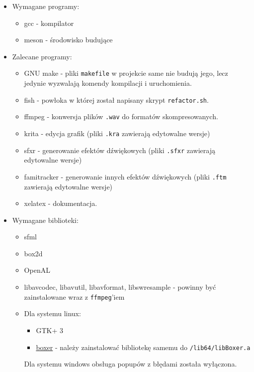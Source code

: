 \documentclass[a4paper,11pt]{article}
\begin{document}
\begin{itemize}
    \item Wymagane programy:
    \begin{itemize}
        \item gcc - kompilator
        \item meson - środowisko budujące
    \end{itemize}
    \item Zalecane programy:
    \begin{itemize}
        \item GNU make - pliki \texttt{makefile} w projekcie same nie budują jego, lecz jedynie wyzwalają komendy kompilacji i uruchomienia.
        \item fish - powłoka w której został napisany skrypt \texttt{refactor.sh}.
        \item ffmpeg - konwersja plików \texttt{.wav} do formatów skompresowanych.
        \item krita - edycja grafik (pliki \texttt{.kra} zawierają edytowalne wersje)
        \item sfxr - generowanie efektów dźwiękowych (pliki \texttt{.sfxr} zawierają edytowalne wersje)
        \item famitracker - generowanie innych efektów dźwiękowych (pliki \texttt{.ftm} zawierają edytowalne wersje)
        \item xelatex - dokumentacja.
    \end{itemize}
    \item Wymagane biblioteki:
    \begin{itemize}
        \item sfml
        \item box2d
        \item OpenAL
        \item libavcodec, libavutil, libavformat, libswresample - powinny być zainstalowane wraz z \texttt{ffmpeg}'iem
        \item Dla systemu linux:
        \begin{itemize}
            \item GTK+ 3
            \item \href{https://github.com/aaronmjacobs/Boxer}{boxer} - należy zainstalować bibliotekę samemu do \texttt{/lib64/libBoxer.a}
        \end{itemize}
        Dla systemu windows obsługa popupów z błędami została wyłączona.
    \end{itemize}
\end{itemize}
\end{document}
